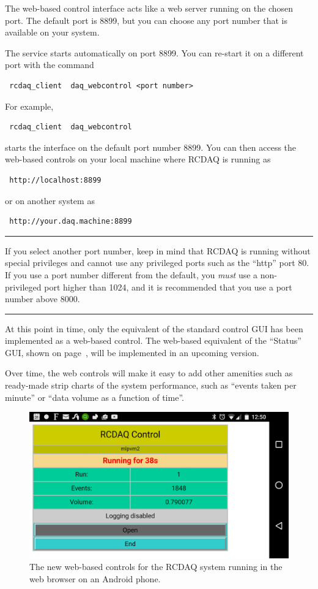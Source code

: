 \documentclass{article}[11pt]
\newcommand{\warning}[1]{
\vskip 3mm
\begin{minipage}[c]{\linewidth}
\hrule
\vskip 2mm
\begin{minipage}[c]{0.1\linewidth}
{\Huge\color{red}{\fontencoding{U}\fontfamily{futs}\selectfont\char 66\relax}}
\end{minipage}
\begin{minipage}[c]{0.9\linewidth}
#1
\end{minipage}
\vskip 2mm
\hrule
\end{minipage}
\vskip 3mm
}
\begin{document}
The web-based control interface acts like a web server running on the
chosen port. The default port is 8899, but you can choose any port
number that is available on your system.

The service starts automatically on port 8899. You can re-start it on a different port with the command
\begin{verbatim}
 rcdaq_client  daq_webcontrol <port number> 
\end{verbatim}

For example,
\begin{verbatim}
 rcdaq_client  daq_webcontrol
\end{verbatim}
starts the interface on the default port number 8899. You can then access the
web-based controls on your local machine where RCDAQ is running as
\begin{verbatim}
 http://localhost:8899
\end{verbatim}
or on another system as
\begin{verbatim}
 http://your.daq.machine:8899
\end{verbatim}

\warning{If you select another port number, keep in mind that RCDAQ is
  running without special privileges and cannot use any privileged
  ports such as the ``http'' port 80. If you use a port number
  different from the default, you \emph{must} use a non-privileged
  port higher than 1024, and it is recommended that you use a port
  number above 8000.}

At this point in time, only the equivalent of the standard control GUI
has been implemented as a web-based control. The web-based equivalent
of the ``Status'' GUI, shown on page~\pageref{rcdaqstatus}, will be
implemented in an upcoming version.

Over time, the web controls will make it easy to add other amenities
such as ready-made strip charts of the system performance, such as
``events taken per minute'' or ``data volume as a function of time''.

\begin{figure}[htb]
  \begin{center}
    \includegraphics[width=0.85\columnwidth]{android.png} 
  \end{center}
  \caption{\label{android}The new web-based controls for the RCDAQ system
    running in the web browser on an Android phone.}
\end{figure}
\end{document}
